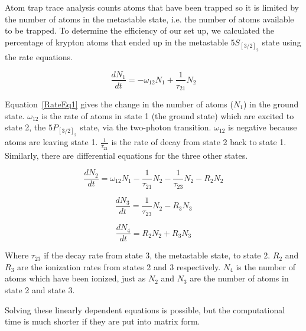 \documentclass[prb,preprint]{revtex4-1}
\begin{document}
Atom trap trace analysis counts atoms that have been trapped so it is limited by the number of atoms in the metastable state, i.e. the number of atoms available to be trapped. To determine the efficiency of our set up, we calculated the percentage of krypton atoms that ended up in the metastable $5S_{[3/2]_2}$ state using the rate equations.

\begin{equation}
\label{RateEq1}
\frac{dN_1}{dt} = -\omega_{12}N_1 + \frac{1}{\tau_{21}}N_2
\end{equation}

Equation~\ref{RateEq1} gives the change in the number of atoms ($N_1$) in the ground state. $\omega_{12}$ is the rate of atoms in state 1 (the ground state) which are excited to state 2, the $5P_{[3/2]_2}$ state, via the two-photon transition. $\omega_{12}$ is negative because atoms are leaving state 1. $\frac{1}{\tau_{21}}$ is the rate of decay from state 2 back to state 1. Similarly, there are differential equations for the three other states.

\begin{equation}
\label{RateEq2}
\frac{dN_2}{dt} = \omega_{12}N_1 -  \frac{1}{\tau_{21}}N_2 - \frac{1}{\tau_{23}}N_2 - R_2N_2
\end{equation}

\begin{equation}
\label{RateEq3}
\frac{dN_3}{dt} =  \frac{1}{\tau_{23}}N_2 - R_3N_3
\end{equation}

\begin{equation}
\label{RateEq4}
\frac{dN_4}{dt} = R_2N_2 + R_3N_3
\end{equation}

Where $\tau_{23}$ if the decay rate from state 3, the metastable state, to state 2. $R_2$ and $R_3$ are the ionization rates from states 2 and 3 respectively. $N_4$ is the number of atoms which have been ionized, just as $N_2$ and $N_3$ are the number of atoms in state 2 and state 3.

Solving these linearly dependent equations is possible, but the computational time is much shorter if they are put into matrix form.
\end{document}
